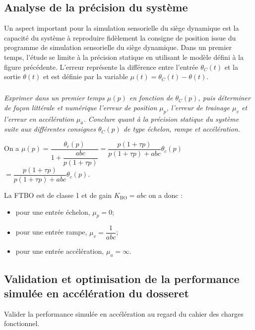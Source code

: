\documentclass[10pt,fleqn]{article} %
\begin{document}
\begin{multicols}{2}
\subsection*{Analyse de la précision du système}

Un aspect important pour la simulation sensorielle du siège dynamique
est la capacité du système à reproduire fidèlement la consigne de
position issue du programme de simulation sensorielle du siège
dynamique. Dans un premier temps, l'étude se limite à la précision
statique en utilisant le modèle défini à la figure précédente. L'erreur
représente la différence entre l'entrée $\theta_C(t)$ et la
sortie $\theta(t)$ et est définie par la variable $\mu(t) = \theta_C(t)-\theta(t)$.


\subparagraph{}\textit{ Exprimer dans un premier temps $\mu(p)$ en fonction de
  $\theta_C(p)$, puis déterminer de façon littérale et numérique
  l'erreur de position $\mu_p$, l'erreur de trainage
  $\mu_v$ et l'erreur en accélération $\mu_a$.
  Conclure quant à la précision statique du système suite aux
  différentes consignes $\theta_C(p)$ de type échelon, rampe et
  accélération.}

\ifprof
\begin{corrige}
On a $\mu(p)=\dfrac{\theta_c(p)}{1+\dfrac{abc}{p\left( 1+\tau p\right)}}=\dfrac{p\left( 1+\tau p\right)}{p\left( 1+\tau p\right)+abc}\theta_c(p)$ $=\dfrac{p\left( 1+\tau p\right)}{p\left( 1+\tau p\right)+abc}\theta_c(p)$.

La FTBO est de classe 1 et de gain $K_{\text{BO}}={abc}$ on a donc : 
\begin{itemize}
\item pour une entrée échelon, $\mu_p = 0$;
\item pour une entrée rampe, $\mu_v = \dfrac{1}{abc}$;
\item pour une entrée accélération, $\mu_a = \infty$.
\end{itemize}
\end{corrige}
\else
\fi

\subsection*{Validation et optimisation de la performance simulée en
accélération du dosseret}

\begin{obj}
Valider la performance simulée en accélération au regard du cahier des
charges fonctionnel.
\end{obj}


\end{multicols}
\end{document}
